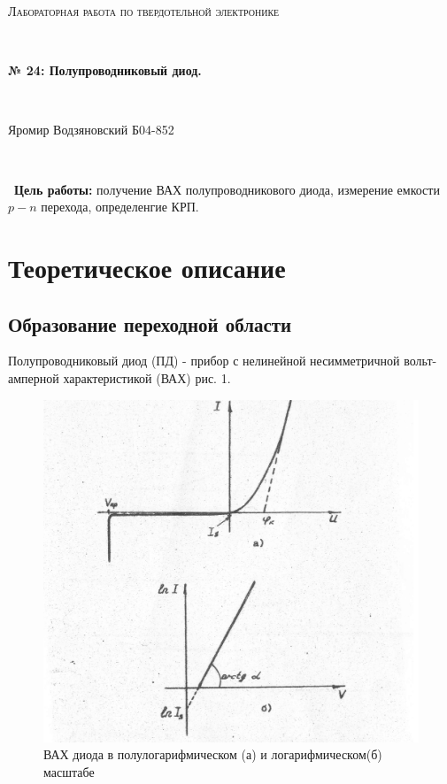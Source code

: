 \documentclass[a4paper]{article}
\begin{document}
\graphicspath{ {pictures/} }
\begin{center}
    {\scshape\Large Лабораторная работа по твердотельной электронике} \par

    \

    {\huge\bfseries № 24: Полупроводниковый диод.} \par 

    \

    {\large Яромир Водзяновский Б04-852}
\end{center}

\

\
\textbf{Цель работы:} получение ВАХ полупроводникового диода, измерение емкости $p-n$ перехода, определенгие КРП.

\pagestyle{fancy} 
\fancyhead[C]{}
\fancyfoot[C]{ \noindent\rule{\textwidth}{0.4pt} \thepage }



\section{Теоретическое описание}
\subsection{Образование переходной области}
Полупроводниковый диод (ПД) - прибор с нелинейной несимметричной вольт-амперной характеристикой (ВАХ) рис. 1.

\begin{figure}[h!]
    \centering
    \includegraphics[scale=0.25]{VAH.jpg}
    \caption{ВАХ диода в полулогарифмическом (а) и логарифмическом(б) масштабе}
    \label{fig:VAH}
\end{figure}
\end{document}
